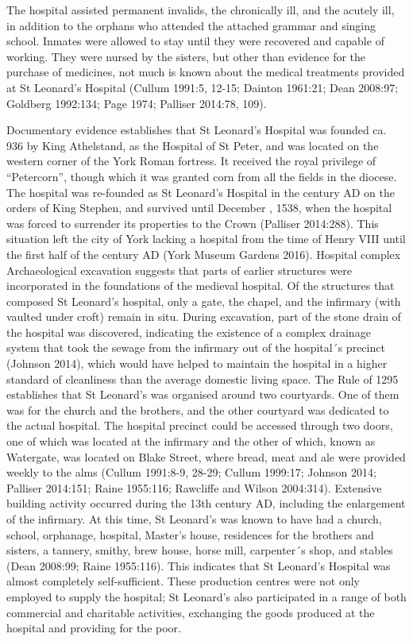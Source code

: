 \documentclass[%
	]{ijsra}
\begin{document}
 The hospital assisted permanent invalids, the chronically ill, and the acutely ill, in addition to the orphans who attended the attached grammar and singing school. Inmates were allowed to stay until they were recovered and capable of working. They were nursed by the sisters, but other than evidence for the purchase of medicines, not much is known about the medical treatments provided at St Leonard’s Hospital (Cullum 1991:5, 12-15; Dainton 1961:21; Dean 2008:97; Goldberg 1992:134; Page 1974; Palliser 2014:78, 109).
 
Documentary evidence establishes that St Leonard’s Hospital was founded ca.\, 936 by King Athelstand, as the Hospital of St Peter, and was located on the western corner of the York Roman fortress. It received the royal privilege of “Petercorn”, though which it was granted corn from all the fields in the diocese. The hospital was re-founded as St Leonard’s Hospital in the  century AD on the orders of King Stephen, and survived until December , 1538, when the hospital was forced to surrender its properties to the Crown (Palliser 2014:288). This situation left the city of York lacking a hospital from the time of Henry VIII until the first half of the  century AD (York Museum Gardens 2016).
Hospital complex
Archaeological excavation suggests that parts of earlier structures were incorporated in the foundations of the medieval hospital. Of the structures that composed St Leonard’s hospital, only a gate, the chapel, and the infirmary (with vaulted under croft) remain in situ. During excavation, part of the stone drain of the hospital was discovered, indicating the existence of a complex drainage system that took the sewage from the infirmary out of the hospital´s precinct (Johnson 2014), which would have helped to maintain the hospital in a higher standard of cleanliness than the average domestic living space.
The Rule of 1295 establishes that St Leonard’s was organised around two courtyards. One of them was for the church and the brothers, and the other courtyard was dedicated to the actual hospital. The hospital precinct could be accessed through two doors, one of which was located at the infirmary and the other of which, known as Watergate, was located on Blake Street, where bread, meat and ale were provided weekly to the alms (Cullum 1991:8-9, 28-29; Cullum 1999:17; Johnson 2014; Palliser 2014:151; Raine 1955:116; Rawcliffe and Wilson 2004:314).
Extensive building activity occurred during the 13th century AD, including the enlargement of the infirmary. At this time, St Leonard’s was known to have had a church, school, orphanage, hospital, Master’s house, residences for the brothers and sisters, a tannery, smithy, brew house, horse mill, carpenter´s shop, and stables (Dean 2008:99; Raine 1955:116). This indicates that St Leonard’s Hospital was almost completely self-sufficient. These production centres were not only employed to supply the hospital; St Leonard’s also participated in a range of both commercial and charitable activities, exchanging the goods produced at the hospital and providing for the poor.
\end{document}
